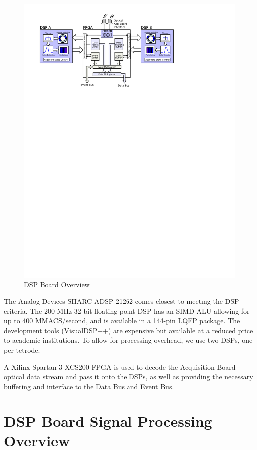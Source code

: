 \begin{figure}
\begin{center}
\includegraphics[scale=1.0]{board-overview.svg}
\end{center}
\caption{DSP Board Overview}
\end{figure}


 The Analog Devices SHARC ADSP-21262 comes closest to meeting
the DSP criteria. The 200 MHz 32-bit floating point DSP has an SIMD
ALU allowing for up to 400 MMACS/second, and is available in a 144-pin
LQFP package. The development tools (VisualDSP++) are expensive but
available at a reduced price to academic institutions. To allow for
processing overhead, we use two DSPs, one per tetrode.  
      
A Xilinx Spartan-3 XCS200 FPGA is used to decode the Acquisition Board
optical data stream and pass it onto the DSPs, as well as providing
the necessary buffering and interface to the Data Bus and Event Bus.

\section{DSP Board Signal Processing Overview}

